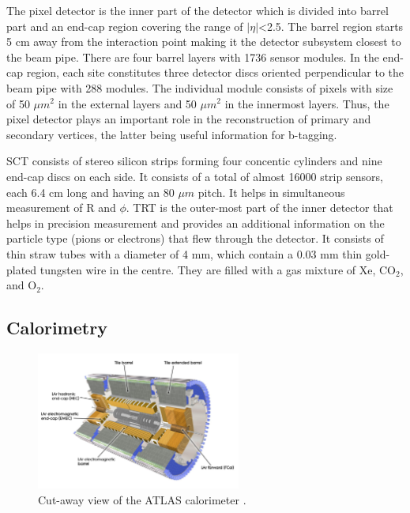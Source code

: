 The pixel detector is the inner part of the detector which is divided into barrel part and an end-cap region covering the range of $|\eta|$<2.5. The barrel region starts 5 cm away from the interaction point making it the detector subsystem closest to the beam pipe. There are four barrel layers with 1736 sensor modules. In the end-cap region, each site constitutes three detector discs oriented perpendicular to the beam pipe with 288 modules. The individual module consists of pixels with size of 50 $\mu m^{2}$ in the external layers and 50 $\mu m^{2}$ in the innermost layers. Thus, the pixel detector plays an important role in the reconstruction of primary and secondary vertices, the latter being useful information for b-tagging.

SCT consists of stereo silicon strips forming four concentic cylinders and nine end-cap discs on each side. It consists of a total of almost 16000 strip sensors, each 6.4 cm long and having an 80 $\mu m$ pitch. It helps in simultaneous measurement of R and $\phi$. TRT is the outer-most part of the inner detector that helps in precision measurement and provides an additional information on the particle type (pions or electrons) that flew through the detector. It consists of thin straw tubes with a diameter of 4 mm, which contain a 0.03 mm thin gold-plated tungsten wire in the centre. They are filled with a gas mixture of Xe, CO$_{2}$, and O$_{2}$.

\subsection{Calorimetry}
\label{sec:calorimetry}

\begin{figure}[!h]
\centering
\includegraphics[width=0.6\textwidth]{ubonn-thesis/Chapters/Chapters_03/Figure/calorimeter.jpg}
\caption{Cut-away view of the ATLAS calorimeter \cite{Pequenao:1095927}.}
\label{fig:calorimeter}
\end{figure}


